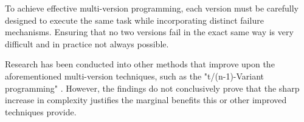 To achieve effective multi-version programming, each version must be carefully designed to execute the same task while incorporating distinct failure mechanisms. Ensuring that no two versions fail in the exact same way is very difficult and in practice not always possible.

Research has been conducted into other methods that improve upon the aforementioned multi-version techniques, such as the "t/(n-1)-Variant programming" \cite{589928}. However, the findings do not conclusively prove that the sharp increase in complexity justifies the marginal benefits this or other improved techniques provide.